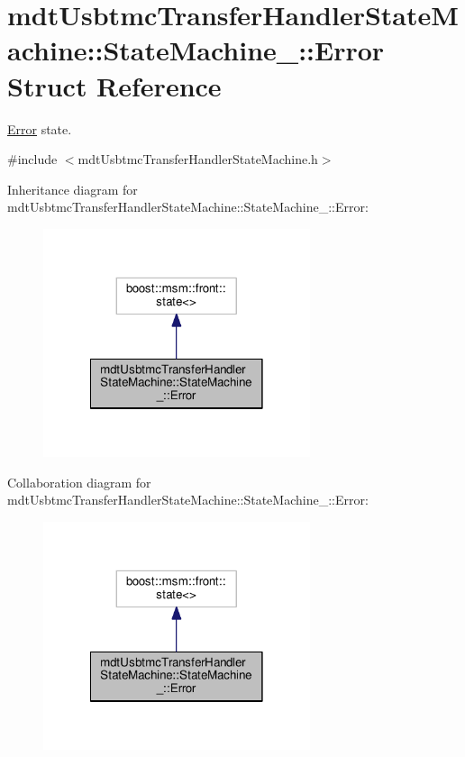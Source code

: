 \hypertarget{structmdt_usbtmc_transfer_handler_state_machine_1_1_state_machine___1_1_error}{\section{mdt\-Usbtmc\-Transfer\-Handler\-State\-Machine\-:\-:State\-Machine\-\_\-\-:\-:Error Struct Reference}
\label{structmdt_usbtmc_transfer_handler_state_machine_1_1_state_machine___1_1_error}
}


\hyperlink{structmdt_usbtmc_transfer_handler_state_machine_1_1_state_machine___1_1_error}{Error} state.  




{\ttfamily \#include $<$mdt\-Usbtmc\-Transfer\-Handler\-State\-Machine.\-h$>$}



Inheritance diagram for mdt\-Usbtmc\-Transfer\-Handler\-State\-Machine\-:\-:State\-Machine\-\_\-\-:\-:Error\-:\nopagebreak
\begin{figure}[H]
\begin{center}
\leavevmode
\includegraphics[width=222pt]{structmdt_usbtmc_transfer_handler_state_machine_1_1_state_machine___1_1_error__inherit__graph}
\end{center}
\end{figure}


Collaboration diagram for mdt\-Usbtmc\-Transfer\-Handler\-State\-Machine\-:\-:State\-Machine\-\_\-\-:\-:Error\-:\nopagebreak
\begin{figure}[H]
\begin{center}
\leavevmode
\includegraphics[width=222pt]{structmdt_usbtmc_transfer_handler_state_machine_1_1_state_machine___1_1_error__coll__graph}
\end{center}
\end{figure}
